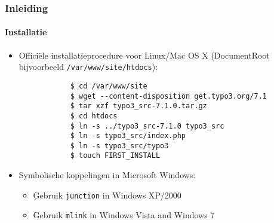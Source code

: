 \begin{frame}[fragile]
	\frametitle{Inleiding}
	\framesubtitle{Installatie}

	\begin{itemize}
		\item Officiële installatieprocedure voor Linux/Mac OS X\newline
			(DocumentRoot bijvoorbeeld \texttt{/var/www/site/htdocs}):
		\begin{lstlisting}
			$ cd /var/www/site
			$ wget --content-disposition get.typo3.org/7.1
			$ tar xzf typo3_src-7.1.0.tar.gz
			$ cd htdocs
			$ ln -s ../typo3_src-7.1.0 typo3_src
			$ ln -s typo3_src/index.php
			$ ln -s typo3_src/typo3
			$ touch FIRST_INSTALL
		\end{lstlisting}

		\item Symbolische koppelingen in Microsoft Windows:

			\begin{itemize}
				\item Gebruik \texttt{junction} in Windows XP/2000
				\item Gebruik \texttt{mlink} in Windows Vista and Windows 7
			\end{itemize}

	\end{itemize}
\end{frame}


